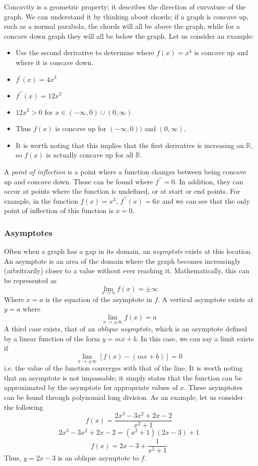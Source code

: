 \documentclass[12pt]{report}
\newcommand{\R}{\mathbb{R}}
\begin{document}
\begin{flushleft}
\bigskip
Concavity is a geometric property; it describes the direction of curvature of 
the graph. We can understand it by thinking about chords; if a graph is concave
up, such as a normal parabola, the chords will all be above the graph, while
for a concave down graph they will all be below the graph. Let us consider an
example:
\begin{itemize}
    \item Use the second derivative to determine where \(f(x) = x^4\) is 
    concave up and where it is concave down.
    \item \(f^\prime(x) = 4x^3\)
    \item \(f^{\prime\prime}(x) = 12x^2\)
    \item \(12x^2 > 0\) for \(x \in (-\infty, 0) \cup (0, \infty)\)
    \item Thus \(f(x)\) is concave up for \((-\infty, 0))\) 
    and \((0, \infty)\).
    \item It is worth noting that this implies that the first derivative is
    increasing on \(\R\), so \(f(x)\) is actually concave up for all \(\R\).
\end{itemize}

A \textit{point of inflection} is a point where a function changes between 
being concave up and concave down. These can be found where 
\(f^{\prime\prime} = 0\). In addition, they can occur at points where the
function is undefined, or at start or end points. For example, in the function
\(f(x) = x^3\), \(f^{\prime\prime}(x) = 6x\) and we can see that the only point
of inflection of this function is \(x = 0\).

\subsubsection*{Asymptotes}
Often when a graph has a gap in its domain, an \textit{asymptote} exists at 
this location. An asymptote is an area of the domain where the graph becomes
increasingly (arbritrarily) closer to a value without ever reaching it. 
Mathematically, this can be represented as
\[\lim_{x \rightarrow a}f(x) = \pm \infty\]
Where \(x = a\) is the equation of the asymptote in \(f\). A vertical asymptote
exists at \(y = a\) where
\[\lim_{x \rightarrow \pm\infty} f(x) = a\]
A third case exists, that of an \textit{oblique asymptote}, which is an 
asymptote defined by a linear function of the form \(y = mx + b\). In this
case, we can say a limit exists if
\[\lim_{x \rightarrow \pm\infty}[f(x) - (mx + b)] = 0\]
i.e. the value of the function converges with that of the line. It is worth
noting that an asymptote is not impassable; it simply states that the function
can be approximated by the asymptote for appropriate values of \(x\). These
asymptotes can be found through polynomial long division. As an example, let us
consider the following
\[f(x) = \frac{2x^3 - 3x^2 + 2x - 2}{x^2 + 1}\]
\[2x^3 - 3x^2 + 2x - 2 = (x^2 + 1)(2x - 3) + 1\]
\[f(x) = 2x - 3 + \frac{1}{x^2 + 1}\]
Thus, \(y = 2x - 3\) is an oblique asymptote to \(f\).


\end{flushleft}
\end{document}
